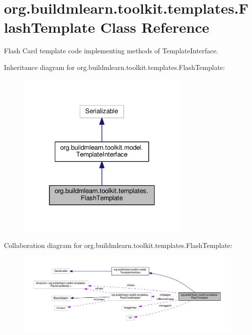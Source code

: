 \hypertarget{classorg_1_1buildmlearn_1_1toolkit_1_1templates_1_1FlashTemplate}{}\section{org.\+buildmlearn.\+toolkit.\+templates.\+Flash\+Template Class Reference}
\label{classorg_1_1buildmlearn_1_1toolkit_1_1templates_1_1FlashTemplate}


Flash Card template code implementing methods of Template\+Interface.  




Inheritance diagram for org.\+buildmlearn.\+toolkit.\+templates.\+Flash\+Template\+:
\nopagebreak
\begin{figure}[H]
\begin{center}
\leavevmode
\includegraphics[width=241pt]{classorg_1_1buildmlearn_1_1toolkit_1_1templates_1_1FlashTemplate__inherit__graph}
\end{center}
\end{figure}


Collaboration diagram for org.\+buildmlearn.\+toolkit.\+templates.\+Flash\+Template\+:
\nopagebreak
\begin{figure}[H]
\begin{center}
\leavevmode
\includegraphics[width=350pt]{classorg_1_1buildmlearn_1_1toolkit_1_1templates_1_1FlashTemplate__coll__graph}
\end{center}
\end{figure}
